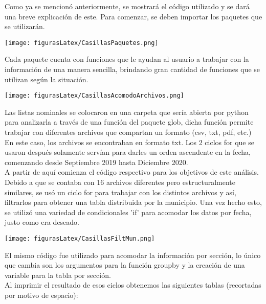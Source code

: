 \documentclass[12pt]{article}
\begin{document}
Como ya se mencionó anteriormente, se mostrará el código utilizado y se dará una breve explicación de este. Para comenzar, se deben importar los paquetes que se utilizarán.\\

\begin{center}
\texttt{[image: figurasLatex/CasillasPaquetes.png]}\label{fig1.1}
\end{center}

Cada paquete cuenta con funciones que le ayudan al usuario a trabajar con la información de una manera sencilla, brindando gran cantidad de funciones que se utilizan según la situación.\\


\begin{center}
\texttt{[image: figurasLatex/CasillasAcomodoArchivos.png]}\label{fig1.2}
\end{center}


Las listas nominales se colocaron en una carpeta que sería abierta por python para analizarla a través de una función del paquete glob, dicha función permite trabajar con diferentes archivos que compartan un formato (csv, txt, pdf, etc.) En este caso, los archivos se encontraban en formato txt. Los 2 ciclos for que se usaron después solamente servían para darles un orden ascendente en la fecha, comenzando desde Septiembre 2019 hasta Diciembre 2020.\\

A partir de aquí comienza el código respectivo para los objetivos de este análisis. Debido a que se contaba con 16 archivos diferentes pero estructuralmente similares, se usó un ciclo for para trabajar con los distintos archivos y así, filtrarlos para obtener una tabla distribuida por la municipio. Una vez hecho esto, se utilizó una variedad de condicionales 'if' para acomodar los datos por fecha, justo como era deseado.\\

\begin{center}
\texttt{[image: figurasLatex/CasillasFiltMun.png]}\label{fig1.3} 
\end{center}

El mismo código fue utilizado para acomodar la información por sección, lo único que cambia son los argumentos para la función groupby y la creación de una variable para la tabla por sección.\\

Al imprimir el resultado de esos ciclos obtenemos las siguientes tablas (recortadas por motivo de espacio):\\
\end{document}

